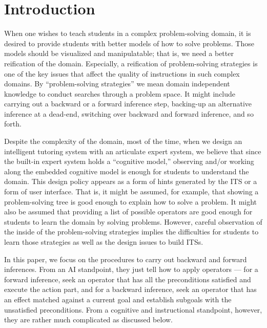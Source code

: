 \section{Introduction}

When one wishes to teach students in a complex problem-solving domain,
it is desired to provide students with better models of how to solve
problems.  Those models should be visualized and manipulatable; that is,
we need a better reification of the domain.  Especially, a reification
of problem-solving strategies is one of the key issues that affect the
quality of instructions in such complex domains.  By ``problem-solving
strategies'' we mean domain independent knowledge to conduct searches
through a problem space.  It might include carrying out a backward or a
forward inference step, backing-up an alternative inference at a
dead-end, switching over backward and forward inference, and so forth.

Despite the complexity of the domain, most of the time, when we design
an intelligent tutoring system with an articulate expert system, we
believe that since the built-in expert system holds a ``cognitive
model,'' observing and/or working along the embedded cognitive model is
enough for students to understand the domain.  This design policy
appears as a form of hints generated by the ITS or a form of user
interface.  That is, it might be assumed, for example, that showing a
problem-solving tree is good enough to explain how to solve a problem.
It might also be assumed that providing a list of possible operators are
good enough for students to learn the domain by solving problems.
However, careful observation of the inside of the problem-solving
strategies implies the difficulties for students to learn those
strategies as well as the design issues to build ITSs. 

In this paper, we focus on the procedures to carry out backward and
forward inferences.  From an AI standpoint, they just tell how to apply
operators --- for a forward inference, seek an operator that has all the
preconditions satisfied and execute the action part, and for a backward
inference, seek an operator that has an effect matched against a current
goal and establish subgoals with the unsatisfied preconditions.  From a
cognitive and instructional standpoint, however, they are rather much
complicated as discussed below.

\newcommand{\g}{\textit{\textbf{g}}}
\newcommand{\G}{\textbf{G}}
\newcommand{\op}{\textit{\textbf{op}}}
\newcommand{\OP}{\textbf{OP}}

